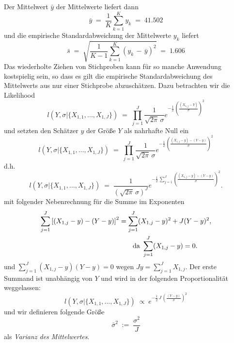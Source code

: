 Der Mittelwert $\bar y$ der Mittelwerte liefert dann
$$
\bar y \; = \; \frac{1}{K} \sum\limits_{k=1}^K y_k \; = \; 41.502
$$
und die empirische Standardabweichung der Mittelwerte $y_k$ liefert
$$
\bar s \; = \; \sqrt{\frac{1}{K-1} \sum\limits_{k=1}^K (y_k \, - \, \bar y)^2 }
 \; = \; 1.606
$$
Das wiederholte Ziehen von Stichproben kann für so manche Anwendung kostspielig sein,
so dass es gilt die empirische Standardabweichung des Mittelwerts aus nur einer
Stichprobe abzuschätzen.
Dazu betrachten wir die Likelihood
\begin{equation}
l(Y, \sigma | \{X_{1,1}, \dots, X_{1,J}\}) \; = \;
\prod\limits_{j=1}^J \frac{1}{\sqrt{2 \pi} \, \sigma}
 e^{- \frac{1}{2} \, \left( \frac{(X_{1,j} - Y)}{\sigma} \right)^2 }
\label{LikelihoodY}
\end{equation}
und
setzten den Schätzer $y$ der Größe $Y$ als nahrhafte Null ein
\begin{equation}
l(Y, \sigma | \{X_{1,1}, \dots, X_{1,J}\}) \; = \;
\prod\limits_{j=1}^J \frac{1}{\sqrt{2 \pi} \, \sigma}
 e^{- \frac{1}{2} \, \left( \frac{(X_{1,j} - y) - (Y - y)}{\sigma} \right)^2 }
\label{LikelihoodNahrhafteNull}
\end{equation}
d.h.
\begin{equation}
l(Y, \sigma | \{X_{1,1}, \dots, X_{1,J}\}) \; = \;
 \frac{1}{(\sqrt{2 \pi} \, \sigma)^J}
 e^{- \frac{1}{2} \, \sum\limits_{j=1}^J \left( \frac{(X_{1,j} - y) - (Y - y)}{\sigma} \right)^2 } .
\end{equation}
mit folgender Nebenrechnung für die Summe im Exponenten
$$
\arraycolsep=2.4pt\def\arraystretch{2}
\begin{aligned}
\sum_{j=1}^J \left[(X_{1,j}-y)-(Y-y)\right]^2
&= \sum_{j=1}^J (X_{1,j}-y)^2 + J(Y-y)^2,\\
&\qquad \text{da }\sum_{j=1}^J(X_{1,j}-y)=0.
\end{aligned}
$$
und $\sum_{j=1}^J(X_{1,j}-y)(Y-y)=0$ wegen $Jy=\sum_{j=1}^J X_{1,j}$.
Der erste Summand ist unabhängig von $Y$ und wird in der folgenden Proportionalität
weggelassen:
\begin{equation}
l(Y, \sigma | \{X_{1,1}, \dots, X_{1,J}\}) \; \propto \;
 e^{- \frac{1}{2} \, J \, \left( \frac{(Y - y)}{\sigma} \right)^2 }
\label{LikelihoodmitJ}
\end{equation}
und wir definieren folgende Größe
\begin{equation}
\bar \sigma^2 \; := \; \frac{\sigma^2}{J}
\label{VarianzMittelwert}
\end{equation}
als \textsl{Varianz des Mittelwertes}.

